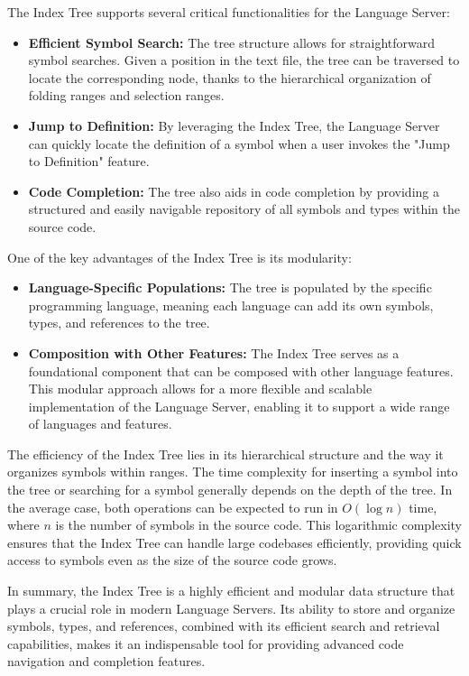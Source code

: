 The Index Tree supports several critical functionalities for the Language Server:
\begin{itemize}
\item \textbf{Efficient Symbol Search:} The tree structure allows for straightforward symbol searches. Given a position in the text file, the tree can be traversed to locate the corresponding node, thanks to the hierarchical organization of folding ranges and selection ranges.
\item \textbf{Jump to Definition:} By leveraging the Index Tree, the Language Server can quickly locate the definition of a symbol when a user invokes the "Jump to Definition" feature.
\item \textbf{Code Completion:} The tree also aids in code completion by providing a structured and easily navigable repository of all symbols and types within the source code.
\end{itemize}

One of the key advantages of the Index Tree is its modularity:

\begin{itemize}
    \item \textbf{Language-Specific Populations:} The tree is populated by the specific programming language, meaning each language can add its own symbols, types, and references to the tree.
    \item \textbf{Composition with Other Features:} The Index Tree serves as a foundational component that can be composed with other language features. This modular approach allows for a more flexible and scalable implementation of the Language Server, enabling it to support a wide range of languages and features.
\end{itemize}

The efficiency of the Index Tree lies in its hierarchical structure and the way it organizes symbols within ranges. The time complexity for inserting a symbol into the tree or searching for a symbol generally depends on the depth of the tree. In the average case, both operations can be expected to run in \(O(\log n)\) time, where \(n\) is the number of symbols in the source code. This logarithmic complexity ensures that the Index Tree can handle large codebases efficiently, providing quick access to symbols even as the size of the source code grows.

In summary, the Index Tree is a highly efficient and modular data structure that plays a crucial role in modern Language Servers. Its ability to store and organize symbols, types, and references, combined with its efficient search and retrieval capabilities, makes it an indispensable tool for providing advanced code navigation and completion features.


